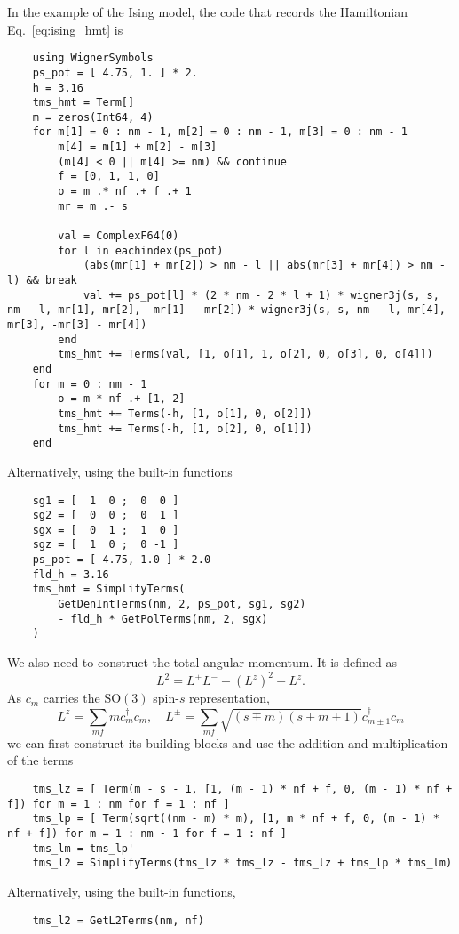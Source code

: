 \documentclass{timesjhep}
\begin{document}
In the example of the Ising model, the code that records the Hamiltonian Eq.~\eqref{eq:ising_hmt} is 
\begin{lstlisting}
    using WignerSymbols
    ps_pot = [ 4.75, 1. ] * 2.
    h = 3.16
    tms_hmt = Term[]
    m = zeros(Int64, 4)
    for m[1] = 0 : nm - 1, m[2] = 0 : nm - 1, m[3] = 0 : nm - 1
        m[4] = m[1] + m[2] - m[3]
        (m[4] < 0 || m[4] >= nm) && continue
        f = [0, 1, 1, 0]
        o = m .* nf .+ f .+ 1
        mr = m .- s
        
        val = ComplexF64(0)
        for l in eachindex(ps_pot)
            (abs(mr[1] + mr[2]) > nm - l || abs(mr[3] + mr[4]) > nm - l) && break 
            val += ps_pot[l] * (2 * nm - 2 * l + 1) * wigner3j(s, s, nm - l, mr[1], mr[2], -mr[1] - mr[2]) * wigner3j(s, s, nm - l, mr[4], mr[3], -mr[3] - mr[4])
        end 
        tms_hmt += Terms(val, [1, o[1], 1, o[2], 0, o[3], 0, o[4]])    
    end 
    for m = 0 : nm - 1
        o = m * nf .+ [1, 2]
        tms_hmt += Terms(-h, [1, o[1], 0, o[2]])
        tms_hmt += Terms(-h, [1, o[2], 0, o[1]])
    end
\end{lstlisting}
Alternatively, using the built-in functions
\begin{lstlisting}
    sg1 = [  1  0 ;  0  0 ]
    sg2 = [  0  0 ;  0  1 ]
    sgx = [  0  1 ;  1  0 ]
    sgz = [  1  0 ;  0 -1 ]
    ps_pot = [ 4.75, 1.0 ] * 2.0
    fld_h = 3.16
    tms_hmt = SimplifyTerms(
        GetDenIntTerms(nm, 2, ps_pot, sg1, sg2)
        - fld_h * GetPolTerms(nm, 2, sgx) 
    )
\end{lstlisting}

We also need to construct the total angular momentum. It is defined as 
\begin{equation}
    L^2=L^+L^-+(L^z)^2-L^z.
\end{equation}
As $c_m$ carries the $\mathrm{SO}(3)$ spin-$s$ representation, 
\begin{equation}
    L^z=\sum_{mf}mc_m^\dagger c_m,\quad L^\pm=\sum_{mf}\sqrt{(s\mp m)(s\pm m+1)}c^\dagger_{m\pm 1}c_m
\end{equation}
we can first construct its building blocks and use the addition and multiplication of the terms
\begin{lstlisting}
    tms_lz = [ Term(m - s - 1, [1, (m - 1) * nf + f, 0, (m - 1) * nf + f]) for m = 1 : nm for f = 1 : nf ]
    tms_lp = [ Term(sqrt((nm - m) * m), [1, m * nf + f, 0, (m - 1) * nf + f]) for m = 1 : nm - 1 for f = 1 : nf ]
    tms_lm = tms_lp' 
    tms_l2 = SimplifyTerms(tms_lz * tms_lz - tms_lz + tms_lp * tms_lm)
\end{lstlisting}
Alternatively, using the built-in functions,
\begin{lstlisting}
    tms_l2 = GetL2Terms(nm, nf)
\end{lstlisting}
\end{document}
